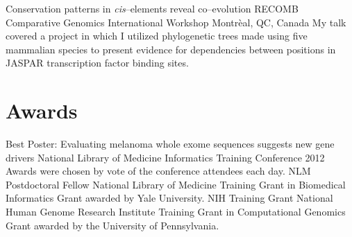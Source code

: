 \documentclass [10pt, letterpaper]{moderncv}
\begin{document}
         {Conservation patterns in
  \emph{cis}--elements reveal co--evolution} 
         {RECOMB Comparative
  Genomics International Workshop} 
         {Montr\`{e}al, QC, Canada} 
         {} 
         {My talk covered a project in which I utilized phylogenetic trees made
          using five
          mammalian species to present evidence for dependencies between
          positions in JASPAR transcription factor binding sites.}



\section {Awards}
         {Best Poster: Evaluating melanoma whole exome sequences suggests new gene drivers}
         {National Library of Medicine Informatics Training Conference 2012}
         {}
         {}
         {Awards were chosen by vote of the conference attendees each day.}
         {NLM Postdoctoral Fellow}
         {National Library of Medicine Training Grant
          in Biomedical Informatics}
         {}
         {}
         {Grant awarded by Yale University.}
         {NIH Training Grant}
         {National Human Genome Research Institute Training Grant
          in Computational Genomics}
         {}
         {}
         {Grant awarded by the University of Pennsylvania.}



\end{document}
